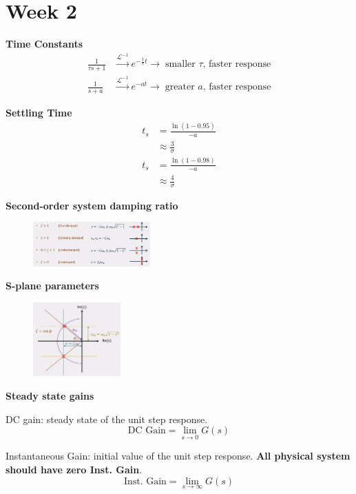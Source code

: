\section{Week 2}
\textbf{Time Constants}
\begin{align*}
    \frac{1}{\tau s + 1} &\xrightarrow{\mathcal{L}^{-1}} e^{-\frac{1}{\tau} t} \to \; \text{smaller $\tau$, faster response} \\
    \frac{1}{s + a} &\xrightarrow{\mathcal{L}^{-1}} e^{-a t} \to \; \text{greater $a$, faster response}
\end{align*}

\textbf{Settling Time}
\begin{align*}
    t_s &= \frac{\ln(1-0.95)}{-a} \\
    &\approx \frac{3}{\sigma} \\
    t_s &= \frac{\ln(1-0.98)}{-a} \\
    &\approx \frac{4}{\sigma}
\end{align*}

\textbf{Second-order system damping ratio}
\begin{figure}[H]
    \centering
    \includegraphics[width=0.4\textwidth]{images/damping_ratio.png}
\end{figure}

\textbf{S-plane parameters}
\begin{figure}[H]
    \centering
    \includegraphics[width=0.3\textwidth]{images/s_plane_parameters.png}
\end{figure}

\textbf{Steady state gains}

DC gain: steady state of the unit step response.
\begin{equation*}
    \text{DC Gain} = \lim_{s\to 0} G(s) 
\end{equation*}

Instantaneous Gain: initial value of the unit step response. \textbf{All physical system should have zero Inst. Gain}.
\begin{equation*}
    \text{Inst. Gain} = \lim_{s\to\infty} G(s)
\end{equation*}


